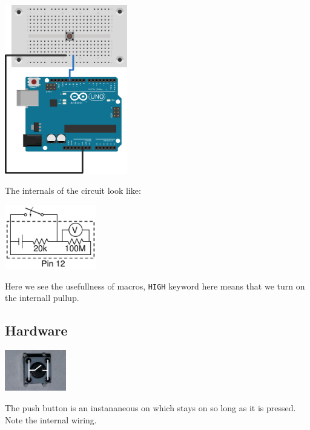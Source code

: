 \begin{center}
    \includegraphics[width=0.4\textwidth]{./Graphics/pull_down_internal}
\end{center}

The internals of the circuit look like:

\begin{center}
    \includegraphics[width=0.3\textwidth]{./Graphics/InternalPullUp}
\end{center}



Here we see the usefullness of macros, 
\lstinline|HIGH|
keyword here means that we turn on the internall pullup.
\subsection{Hardware}
\begin{center}
    \includegraphics[width=0.2\textwidth]{./Graphics/push_button_internal}
\end{center}

The push button is an instananeous on which stays on so long
as it is pressed.
Note the internal wiring.
